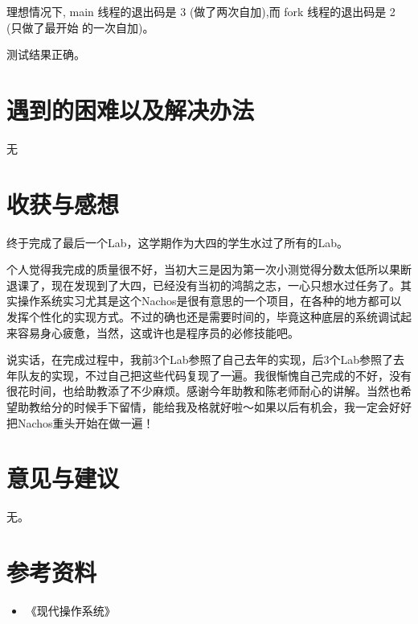 \documentclass[nofonts]{ctexart}
\begin{document}
理想情况下, main 线程的退出码是 3 (做了两次自加),而 fork 线程的退出码是 2 (只做了最开始
的一次自加)。

测试结果正确。


\section{遇到的困难以及解决办法}
无

\section{收获与感想}
终于完成了最后一个Lab，这学期作为大四的学生水过了所有的Lab。

个人觉得我完成的质量很不好，当初大三是因为第一次小测觉得分数太低所以果断退课了，现在发现到了大四，已经没有当初的鸿鹄之志，一心只想水过任务了。其实操作系统实习尤其是这个Nachos是很有意思的一个项目，在各种的地方都可以发挥个性化的实现方式。不过的确也还是需要时间的，毕竟这种底层的系统调试起来容易身心疲惫，当然，这或许也是程序员的必修技能吧。

说实话，在完成过程中，我前3个Lab参照了自己去年的实现，后3个Lab参照了去年队友的实现，不过自己把这些代码复现了一遍。我很惭愧自己完成的不好，没有很花时间，也给助教添了不少麻烦。感谢今年助教和陈老师耐心的讲解。当然也希望助教给分的时候手下留情，能给我及格就好啦～如果以后有机会，我一定会好好把Nachos重头开始在做一遍！



\section{意见与建议}
无。

\section{参考资料}
\begin{itemize}
\item 《现代操作系统》
\end{itemize}
\end{document}
